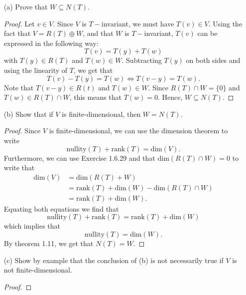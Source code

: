 \begin{enumerate}
    \item[(a)] Prove that \( W \subseteq N(T) \). 
        \begin{proof}
        Let \( v \in V  \). Since \( V  \) is \( T- \)invariant, we must have \( T(v) \in V  \). Using the fact that \( V = R(T) \oplus W   \), and that \( W  \) is \( T- \)invariant, \( T(v) \) can be expressed in the following way:
        \[  T(v) = T(y) + T(w) \tag{1} \]
        with \( T(y) \in R(T)  \) and \( T(w) \in W  \). Subtracting \( T(y)  \) on both sides and using the linearity of \( T \), we get that 
        \[  T(v) - T(y) = T(w) \iff T(v-y) = T(w). \]
        Note that \( T(v-y) \in R(t)  \) and \( T(w) \in  W  \). Since \( R(T) \cap W = \{ 0  \}  \) and \( T(w) \in R(T) \cap W  \), this means that \( T(w) = 0  \). Hence, \( W \subseteq N(T) \).
        \end{proof}
    \item[(b)] Show that if \( V  \) is finite-dimensional, then \( W = N(T) \).
        \begin{proof}
            Since \( V  \) is finite-dimensional, we can use the dimension theorem to write
            \[  \text{nullity}(T) + \text{rank}(T) = \text{dim}(V). \]
            Furthermore, we can use Exercise 1.6.29 and that \( \text{dim}(R(T) \cap W) = 0  \) to write that 
            \begin{align*} 
                \text{dim}(V) &= \text{dim}(R(T) + W) \\
                              &= \text{rank}(T) + \text{dim}(W) - \text{dim}(R(T) \cap W) \\
                              &= \text{rank}(T) + \text{dim}(W). 
            \end{align*}
            Equating both equations we find that
            \[ \text{nullity}(T) + \text{rank}(T) = \text{rank}(T) + \text{dim}(W)  \]
            which implies that
            \[  \text{nullity}(T) = \text{dim}(W). \]
            By theorem 1.11, we get that \( N(T) = W  \).
        \end{proof}
    \item[(c)] Show by example that the conclusion of (b) is not necessarily true if \( V  \) is not finite-dimensional.
        \begin{proof}
        
        \end{proof}
\end{enumerate}

